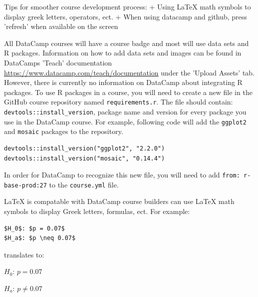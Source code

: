 \documentclass[12pt]{article}
\begin{document}
Tips for smoother course development process:
    + Using LaTeX math symbols to display greek letters, operators, ect.
    + When using datacamp and github, press 'refresh' when available on the screen

All DataCamp courses will have a course badge and most will use data sets and R packages. Information on how to add data sets and images
can be found in DataCamps 'Teach' documentation \url{https://www.datacamp.com/teach/documentation} under the 'Upload Assets' tab. However,
there is currently no information on DataCamp about integrating R packages. To use R packages in a course, you will need to create a new file
in the GitHub course repository named \texttt{requirements.r}. The file should contain: \texttt{devtools::install\_version}, package name and version for 
every package you use in the DataCamp course. For example, following code will add the \texttt{ggplot2} and \texttt{mosaic} packages to the repository.

\begin{verbatim}
devtools::install_version("ggplot2", "2.2.0")
devtools::install_version("mosaic", "0.14.4")
\end{verbatim}
In order for DataCamp to recognize this new file, you will need to add \texttt{from: r-base-prod:27} to the \texttt{course.yml} file.

LaTeX is compatable with DataCamp course builders can use LaTeX math symbols to display Greek letters, formulas, ect. For example:
\begin{verbatim}
$H_0$: $p = 0.07$
$H_a$: $p \neq 0.07$
\end{verbatim}

translates to:

$H_0$: $p = 0.07$

$H_a$: $p \neq 0.07$







%


\end{document}
